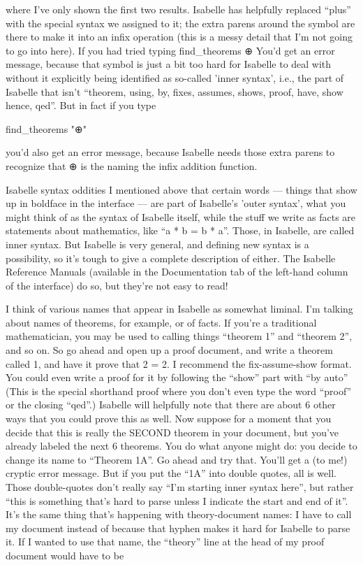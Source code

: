 where I've only shown the first two results. Isabelle has helpfully replaced ``plus'' with the special syntax we assigned to it; the extra parens around the symbol are there to make it into an infix operation (this is a messy detail that I'm not going to go into here). If you had tried typing
find_theorems  ⊕
You'd get an error message, because that symbol is just a bit too hard for Isabelle to deal with without it explicitly being identified as so-called 'inner syntax', i.e., the part of Isabelle that isn't ``theorem, using, by, fixes, assumes, shows, proof, have, show hence, qed''. But in fact if you type 

find_theorems "⊕"

you'd also get an error message, because Isabelle needs those extra parens to recognize that ⊕ is the naming the infix addition function. 

Isabelle syntax oddities
I mentioned above that certain words --- things that show up in boldface in the interface --- are part of Isabelle's 'outer syntax', what you might think of as the syntax of Isabelle itself, while the stuff we write as facts are statements about mathematics, like ``a * b = b * a''. Those, in Isabelle, are called inner syntax. But Isabelle is very general, and defining new syntax is a possibility, so it's tough to give a complete description of either. The Isabelle Reference Manuals (available in the Documentation tab of the left-hand column of the interface) do so, but they're not easy to read! 

I think of various names that appear in Isabelle as somewhat liminal. I'm talking about names of theorems, for example, or of facts. If you're a traditional mathematician, you may be used to calling things ``theorem 1'' and ``theorem 2'', and so on. So go ahead and open up a proof document, and write a theorem called 1, and have it prove that 2 = 2. I recommend the fix-assume-show format. You could even write a proof for it by following the ``show'' part with ``by auto''  (This is the special shorthand proof where you don't even type the word ``proof'' or the closing ``qed''.) Isabelle will helpfully note that there are about 6 other ways that you could prove this as well. Now suppose for a moment that you decide that this is really the SECOND theorem in your document, but you've already labeled the next 6 theorems. You do what anyone might do: you decide to change its name to ``Theorem 1A''. Go ahead and try that. You'll get a (to me!) cryptic error message. But if you put the ``1A'' into double quotes, all is well. Those double-quotes don't really say ``I'm starting inner syntax here'', but rather ``this is something that's hard to parse unless I indicate the start and end of it''. It's the same thing that's happening with theory-document names: I have to call my document   instead of   because that hyphen makes it hard for Isabelle to parse it. If I wanted to use that name, the ``theory'' line at the head of my proof document would have to be 

